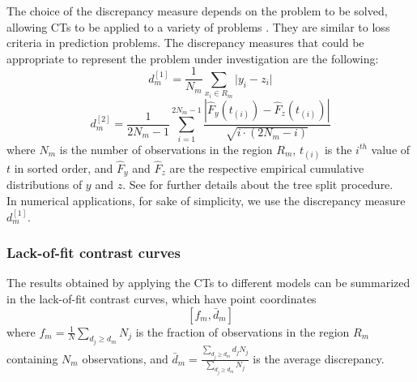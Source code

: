 \documentclass[fleqn,10pt]{wlscirep}
\begin{document}
The choice of the discrepancy measure depends on the problem to be solved, allowing CTs to be applied to a variety of problems \cite{Friedman2020}. They are similar to loss criteria in prediction problems. 
The discrepancy measures that could be appropriate to represent the problem under investigation are the following:
\begin{equation}
\label{eq:dm1}
d_m^{[1]} = \frac{1}{N_m} \sum_{x_i \in R_m} \lvert y_i-z_i \rvert
\end{equation}
%
\begin{equation}
\label{eq:dm2}
d_m^{[2]} = \frac{1}{2N_m-1} \sum_{i =1}^{2N_m-1} \frac{\left| \hat{F}_y(t_{(i)})-\hat{F}_z(t_{(i)})\right|}{\sqrt{i\cdot(2N_m-i)}}
\end{equation}
where $N_m$ is the number of observations in the region $R_m$,  $t_{(i)}$ is the $i^{th}$ value of $t$ in sorted order, and $\hat{F}_y$ and $\hat{F}_z$ are the respective empirical cumulative distributions of $y$ and $z$. See \cite{Friedman2020} for further details about the tree split procedure.\\
In numerical applications, for sake of simplicity, we use the discrepancy measure $d_m^{[1]}$.

\subsubsection*{Lack-of-fit contrast curves}

The results obtained by applying the CTs to different models can be summarized in the lack-of-fit contrast curves, which have point coordinates 
$$[f_m,\bar{d}_m]$$
where $f_m=\frac{1}{N}\sum_{d_j\geq d_m}N_j$ is the fraction of observations in the region $R_m$ containing $N_m$ observations, and $\bar{d}_m=\frac{\sum_{d_j\geq d_m}d_j N_j}{\sum_{d_j\geq d_m}N_j}$ is the average discrepancy.
\end{document}
